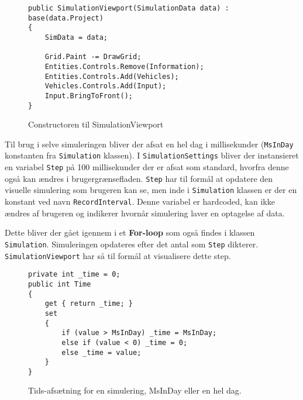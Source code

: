 \begin{figure}[H]
\begin{lstlisting}
public SimulationViewport(SimulationData data) : base(data.Project)
{
    SimData = data;
            
    Grid.Paint -= DrawGrid;
    Entities.Controls.Remove(Information);
    Entities.Controls.Add(Vehicles);
    Vehicles.Controls.Add(Input);
    Input.BringToFront();
}
\end{lstlisting}
\caption{Constructoren til SimulationViewport}
\label{ViewportSimulationConstructor}
\end{figure}

Til brug i selve simuleringen bliver der afsat en hel dag i millisekunder (\texttt{MsInDay} konstanten fra \texttt{Simulation} klassen). I \texttt{SimulationSettings} bliver der instansieret en variabel \texttt{Step} på 100 millisekunder der er afsat som standard, hvorfra denne også kan ændres i brugergrænsefladen. \texttt{Step} har til formål at opdatere den visuelle simulering som brugeren kan se, men inde i \texttt{Simulation} klassen er der en konstant ved navn \texttt{RecordInterval}. Denne variabel er hardcoded, kan ikke ændres af brugeren og indikerer hvornår simulering laver en optagelse af data. 

\vspace{5mm}

Dette bliver der gået igennem i et \textbf{For-loop} som også findes i klassen \texttt{Simulation}. Simuleringen opdateres efter det antal som \texttt{Step} dikterer. \texttt{SimulationViewport} har så til formål at visualisere dette step.

\begin{figure}[H]
\begin{lstlisting}
private int _time = 0;
public int Time
{
    get { return _time; }
    set
    {
        if (value > MsInDay) _time = MsInDay;
        else if (value < 0) _time = 0;
        else _time = value;
    }
}
\end{lstlisting}
\caption{Tids-afsætning for en simulering, MsInDay eller en hel dag.}
\label{TimeForSim}
\end{figure}



